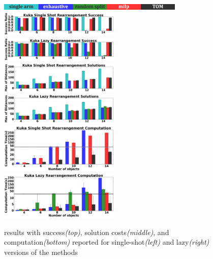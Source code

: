 \begin{figure}[h]
\vspace{-0.2in}
	\centering
	\includegraphics[width=3.5in]{figures/results/labels}
	\includegraphics[width=2.25in]{figures/results/2_kuka_ms_success}
	\includegraphics[width=2.25in]{figures/results/1_kuka_lazy_ms_success}
	\includegraphics[width=2.25in]{figures/results/2_kuka_ms_cost}
	\includegraphics[width=2.25in]{figures/results/1_kuka_lazy_ms_cost}
	\includegraphics[width=2.25in]{figures/results/2_kuka_ms_time}
	\includegraphics[width=2.25in]{figures/results/1_kuka_lazy_ms_time}
	\vspace{-0.15in}
    \caption{\textit{\kuka}results with success\textit{(top)}, solution costs\textit{(middle)}, and computation\textit{(bottom)} reported for single-shot\textit{(left)} and lazy\textit{(right)} versions of the methods}
    \vspace{-0.3in}
	\label{fig:kuka}
\end{figure}


